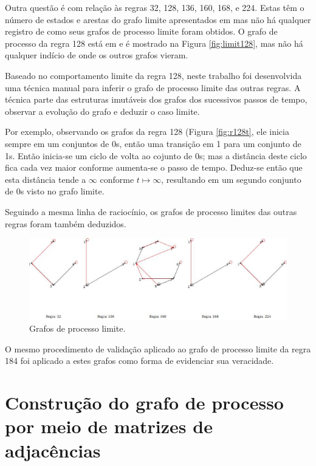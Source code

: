 \documentclass[12pt,a4paper]{article}
\begin{document}
Outra questão é com relação às regras 32, 128, 136, 160, 168, e 224. Estas têm
o número de estados e arestas do grafo limite apresentados em
 mas não há qualquer registro de como seus grafos
de processo limite foram obtidos. O grafo de processo da regra 128 está
em  e é mostrado na Figura \ref{fig:limit128}, mas
não há qualquer indício de onde os outros grafos vieram.

Baseado no comportamento limite da regra 128, neste trabalho foi desenvolvida
uma técnica manual para inferir o grafo de processo limite das outras regras.
A técnica parte das estruturas imutáveis dos grafos dos
sucessivos passos de tempo, observar a evolução do grafo e deduzir o caso
limite.

Por exemplo, observando os grafos da regra 128 (Figura \ref{fig:r128t}, ele
inicia sempre em um conjuntos de 0s, então uma transição em 1 para um
conjunto de 1s.  Então inicia-se um ciclo de volta ao cojunto de 0s; mas a
distância deste ciclo fica cada vez maior conforme aumenta-se o passo de
tempo. Deduz-se então que esta distância tende a $\infty$ conforme
$t \mapsto \infty$, resultando em um segundo conjunto de 0s visto no grafo
limite.

Seguindo a mesma linha de raciocínio, os grafos de processo limites das
outras regras foram também deduzidos.

\begin{figure}[H]
\begin{center}
\includegraphics[scale=0.6]{img/Limits.eps}
\caption{Grafos de processo limite.}
\label{fig:limits}
\end{center}
\end{figure}

O mesmo procedimento de validação aplicado ao grafo de processo limite da
regra 184 foi aplicado a estes grafos como forma de evidenciar sua
veracidade.

\newpage

\section{Construção do grafo de processo por meio de matrizes de
adjacências}\label{sec:desenv}
\end{document}
